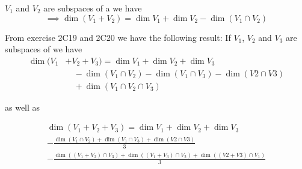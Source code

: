 \begin{thm} $V_1$ and $V_2$ are subspaces of a \fdvs we have
  \begin{equation}
    \implies \dim (V_1 + V_2) = \dim V_1 + \dim V_2 - \dim (V_1 \cap V_2)
  \end{equation}

  From exercise 2C19 and 2C20 we have the following result:
  If $V_1$, $V_2$ and $V_3$ are subspaces of \fdvs we have
  \begin{equation}
    \begin{aligned}
      \dim (V_1 &+ V_2 + V_3) = \dim V_1 + \dim V_2 + \dim V_3 \\
      & \quad - \dim (V_1 \cap V_2) - \dim (V_1 \cap V_3) - \dim (V2 \cap V3) \\
      & \quad + \dim (V_1 \cap V_2 \cap V_3)
    \end{aligned}
  \end{equation}

as well as

  \begin{equation}
    \begin{aligned}
      \dim (V_1 + V_2 + V_3)  = \dim V_1 + \dim V_2 + \dim V_3 \\
        - \frac{\dim (V_1 \cap V_2) + \dim (V_1 \cap V_3) + \dim (V2 \cap V3)}{3} \\
       - \frac{ \dim \left(  (V_1 + V_2) \cap V_3 \right) + \dim \left( (V_1 + V_3) \cap V_2 \right)+ \dim \left( (V2 + V3) \cap V_1 \right) }{3} \\
    \end{aligned}
  \end{equation}
\end{thm}

